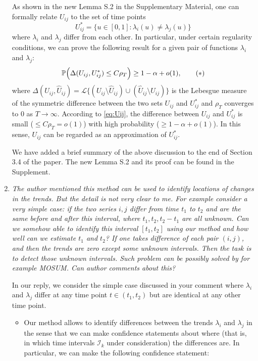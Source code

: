 \documentclass[a4paper,12pt]{article}
\begin{document}
\begin{enumerate}[label=(\arabic*),leftmargin=0.7cm]
As shown in the new Lemma S.2 in the Supplementary Material, one can formally relate $U_{ij}$ to the set of time points 
\[ U_{ij}^* = \{ u \in [0,1]: \lambda_i(u) \ne \lambda_j(u) \} \]
where $\lambda_i$ and $\lambda_j$ differ from each other. In particular, under certain regularity conditions, we can prove the following result for a given pair of functions $\lambda_i$ and $\lambda_j$: 
\begin{equation}\label{eq:Uij}
\mathbb{P}  \Big( \Delta(U_{ij}, U_{ij}^*) \le C \rho_T \Big) \ge 1-\alpha + o(1), \tag{$*$}
\end{equation}
where $\Delta(U_{ij},\hat{U}_{ij}) = \mathcal{L} \{(U_{ij} \setminus \hat{U}_{ij}) \cup (\hat{U}_{ij} \setminus U_{ij})\}$ is the Lebesgue measure of the symmetric difference between the two sets $U_{ij}$ and $U_{ij}^*$ and $\rho_T$ converges to $0$ as $T \to \infty$. According to \eqref{eq:Uij}, the difference between $U_{ij}$ and $U_{ij}^*$ is small ($\le C\rho_T = o(1)$) with high probability ($\ge 1 -\alpha + o(1)$). In this sense, $U_{ij}$ can be regarded as an approximation of $U_{ij}^*$. 

We have added a brief summary of the above discussion to the end of Section 3.4 of the paper. The new Lemma S.2 and its proof can be found in the Supplement.


\item \textit{The author mentioned this method can be used to identify locations of changes in the trends. But the detail is not very clear to me. For example consider a very simple case: if the two series $i, j$ differ from time $t_1$ to $t_2$ and are the same before and after this interval, where $t_1, t_2, t_2 - t_1$ are all unknown. Can we somehow able to identify this interval $[t_1, t_2]$ using our method and how well can we estimate $t_1$ and $t_2$? If one takes difference of each pair $(i, j)$, and then the trends are zero except some unknown intervals. Then the task is to detect those unknown intervals. Such problem can be possibly solved by for example MOSUM. Can author comments about this?}

In our reply, we consider the simple case discussed in your comment where $\lambda_i$ and $\lambda_j$ differ at any time point $t \in (t_1,t_2)$ but are identical at any other time point.
\begin{itemize}[leftmargin=0.4cm]

\item Our method allows to identify differences between the trends $\lambda_i$ and $\lambda_j$ in the sense that we can make confidence statements about where (that is, in which time intervals $\mathcal{I}_k$ under consideration) the differences are. In particular, we can make the following confidence statement: 
\vspace{0.1cm}


\end{itemize}
\end{enumerate}
\end{document}
